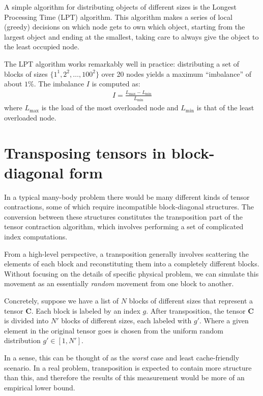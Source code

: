 \documentclass[fleqn, 12pt]{article}
\begin{document}
A simple algorithm for distributing objects of different sizes is the Longest
Processing Time (LPT) algorithm.  This algorithm makes a series of local
(greedy) decisions on which node gets to own which object, starting from the
largest object and ending at the smallest, taking care to always give the
object to the least occupied node.

The LPT algorithm works remarkably well in practice: distributing a set of
blocks of sizes $\{1^1, 2^2, \ldots, 100^2\}$ over 20 nodes yields a maximum
``imbalance'' of about $1\%$.  The imbalance $I$ is computed as:
\begin{align*}
  I = \frac{L_\text{max} - L_\text{min}}{L_\text{min}}
\end{align*}
where $L_\text{max}$ is the load of the most overloaded node and
$L_\text{min}$ is that of the least overloaded node.

\section{Transposing tensors in block-diagonal form}

In a typical many-body problem there would be many different kinds of tensor
contractions, some of which require incompatible block-diagonal structures.
The conversion between these structures constitutes the transposition part of
the tensor contraction algorithm, which involves performing a set of
complicated index computations.

From a high-level perspective, a transposition generally involves scattering
the elements of each block and reconstituting them into a completely different
blocks.  Without focusing on the details of specific physical problem, we can
simulate this movement as an essentially \emph{random} movement from one block
to another.

Concretely, suppose we have a list of $N$ blocks of different sizes that
represent a tensor $\bm C$.  Each block is labeled by an index $g$.  After
transposition, the tensor $\bm C$ is divided into $N'$ blocks of different
sizes, each labeled with $g'$.  Where a given element in the original tensor
goes is chosen from the uniform random distribution $g' \in [1, N']$.

In a sense, this can be thought of as the \emph{worst} case and least
cache-friendly scenario.  In a real problem, transposition is expected to
contain more structure than this, and therefore the results of this
measurement would be more of an empirical lower bound.
\end{document}
